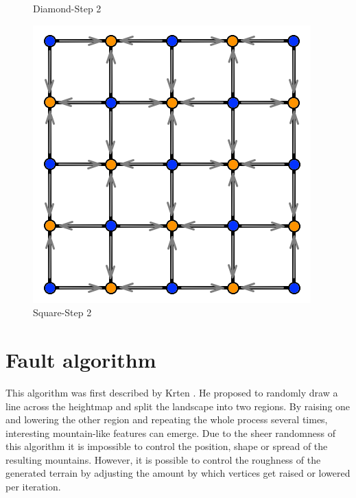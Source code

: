\documentclass[11pt,a4paper,twoside,openright]{report}
\begin{document}
\begin{figure}[!htb]
  \caption{Diamond-Step 2}\label{fig:ds4}
\endminipage
{}%
  \includegraphics[width=\linewidth]{ds5.png}
  \caption{Square-Step 2}\label{fig:ds5}
\endminipage
\end{figure}

\section{Fault algorithm}
This algorithm was first described by Krten \cite{Krten:1994}. He proposed to randomly draw a line across the heightmap and split the landscape into two regions. By raising one and lowering the other region and repeating the whole process several times, interesting mountain-like features can emerge. Due to the sheer randomness of this algorithm it is impossible to control the position, shape or spread of the resulting mountains. However, it is possible to control the roughness of the generated terrain by adjusting the amount by which vertices get raised or lowered per iteration.
\end{document}
